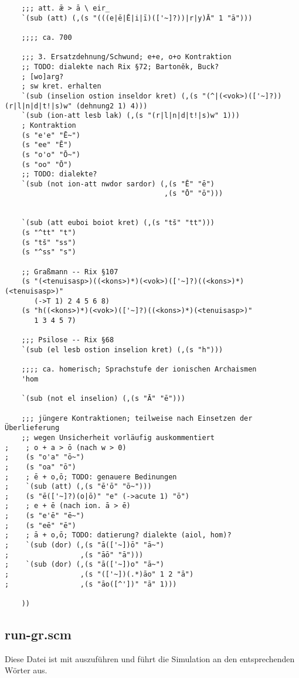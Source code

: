 \begin{verbatim}
    ;;; att. ǣ > ā \ eir_
    `(sub (att) (,(s "(((e|ē|Ē|i|ī)(['~]?))|r|y)Ā" 1 "ā")))

    ;;;; ca. 700

    ;;; 3. Ersatzdehnung/Schwund; e+e, o+o Kontraktion
    ;; TODO: dialekte nach Rix §72; Bartoněk, Buck?
    ; [wo]arg?
    ; sw kret. erhalten
    `(sub (inselion ostion inseldor kret) (,(s "(^|(<vok>)(['~]?))(r|l|n|d|t!|s)w" (dehnung2 1) 4)))
    `(sub (ion-att lesb lak) (,(s "(r|l|n|d|t!|s)w" 1)))
    ; Kontraktion
    (s "e'e" "Ē~")
    (s "ee" "Ē")
    (s "o'o" "Ō~")
    (s "oo" "Ō")
    ;; TODO: dialekte?
    `(sub (not ion-att nwdor sardor) (,(s "Ē" "ē")
                                      ,(s "Ō" "ō")))


    `(sub (att euboi boiot kret) (,(s "tš" "tt")))
    (s "^tt" "t")
    (s "tš" "ss")
    (s "^ss" "s")

    ;; Graßmann -- Rix §107
    (s "(<tenuisasp>)((<kons>)*)(<vok>)(['~]?)((<kons>)*)(<tenuisasp>)"
       (->T 1) 2 4 5 6 8)
    (s "h((<kons>)*)(<vok>)(['~]?)((<kons>)*)(<tenuisasp>)"
       1 3 4 5 7)

    ;;; Psilose -- Rix §68
    `(sub (el lesb ostion inselion kret) (,(s "h")))

    ;;;; ca. homerisch; Sprachstufe der ionischen Archaismen
    'hom

    `(sub (not el inselion) (,(s "Ā" "ē")))

    ;;; jüngere Kontraktionen; teilweise nach Einsetzen der Überlieferung
    ;; wegen Unsicherheit vorläufig auskommentiert
;    ; o + a > ō (nach w > 0)
;    (s "o'a" "ō~")
;    (s "oa" "ō")
;    ; ē + o,ō; TODO: genauere Bedinungen
;    `(sub (att) (,(s "ē'ō" "ō~")))
;    (s "ē(['~]?)(o|ō)" "e" (->acute 1) "ō")
;    ; e + ē (nach ion. ā > ē)
;    (s "e'ē" "ē~")
;    (s "eē" "ē")
;    ; ā + o,ō; TODO: datierung? dialekte (aiol, hom)?
;    `(sub (dor) (,(s "ā(['~])ō" "ā~")
;                 ,(s "āō" "ā")))
;    `(sub (dor) (,(s "ā(['~])o" "ā~")
;                 ,(s "(['~])(.*)āo" 1 2 "ā")
;                 ,(s "āo([^'])" "ā" 1)))

    ))

\end{verbatim}

\subsection{run-gr.scm}
Diese Datei ist mit  auszuführen
und führt die Simulation an den entsprechenden Wörter aus.

